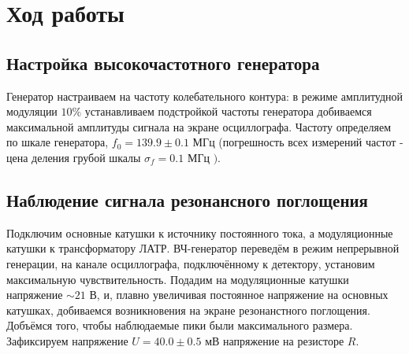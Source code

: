 \documentclass[a4paper,12pt]{extarticle}
\begin{document}

\section*{Ход работы}
\subsection*{Настройка высокочастотного генератора}
Генератор настраиваем на частоту колебательного контура: в режиме амплитудной модуляции $10 \%$ устанавливаем подстройкой частоты генератора добиваемся максимальной амплитуды сигнала на экране осциллографа. Частоту определяем по шкале генератора, $f_{0}=139.9 \pm 0.1$ МГц (погрешность всех измерений частот - цена деления грубой шкалы $\sigma_{f}=0.1$ МГц $) .$ 





\subsection*{Наблюдение сигнала резонансного поглощения}
Подключим основные катушки к источнику постоянного тока, а модуляционные катушки к трансформатору ЛАТР. ВЧ-генератор переведём в режим непрерывной генерации, на канале осциллографа, подключённому к детектору, установим максимальную чувствительность. Подадим на модуляционные катушки напряжение $\sim 21$ В, и, плавно увеличивая постоянное напряжение на основных катушках, добиваемся возникновения на экране резонанстного поглощения. Добъёмся того, чтобы наблюдаемые пики были максимального размера. Зафиксируем напряжение $U=40.0 \pm 0.5$ мВ напряжение на резисторе $R$.
\end{document}
